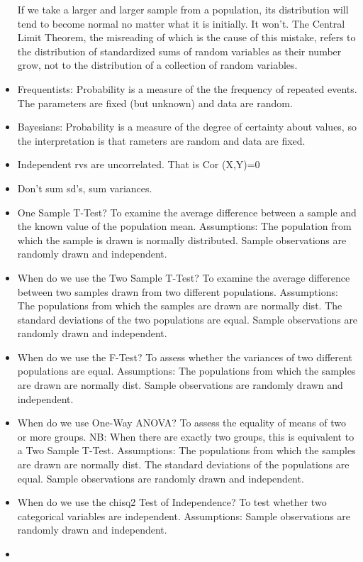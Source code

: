 \documentclass[]{book}
\begin{document}
\begin{itemize}
  If we take a larger and larger sample from a population, its
  distribution will tend to become normal no matter what it is
  initially. It won't. The Central Limit Theorem, the misreading of
  which is the cause of this mistake, refers to the distribution of
  standardized sums of random variables as their number grow, not to the
  distribution of a collection of random variables.
\item
  Frequentists: Probability is a measure of the the frequency of
  repeated events. The parameters are fixed (but unknown) and data are
  random.
\item
  Bayesians: Probability is a measure of the degree of certainty about
  values, so the interpretation is that rameters are random and data are
  fixed.
\item
  Independent rvs are uncorrelated. That is Cor (X,Y)=0
\item
  Don't sum sd's, sum variances.
\item
  One Sample T-Test? To examine the average difference between a sample
  and the known value of the population mean. Assumptions: The
  population from which the sample is drawn is normally distributed.
  Sample observations are randomly drawn and independent.
\item
  When do we use the Two Sample T-Test? To examine the average
  difference between two samples drawn from two different populations.
  Assumptions: The populations from which the samples are drawn are
  normally dist. The standard deviations of the two populations are
  equal. Sample observations are randomly drawn and independent.
\item
  When do we use the F-Test? To assess whether the variances of two
  different populations are equal. Assumptions: The populations from
  which the samples are drawn are normally dist. Sample observations are
  randomly drawn and independent.
\item
  When do we use One-Way ANOVA? To assess the equality of means of two
  or more groups. NB: When there are exactly two groups, this is
  equivalent to a Two Sample T-Test. Assumptions: The populations from
  which the samples are drawn are normally dist. The standard deviations
  of the populations are equal. Sample observations are randomly drawn
  and independent.
\item
  When do we use the chisq2 Test of Independence? To test whether two
  categorical variables are independent. Assumptions: Sample
  observations are randomly drawn and independent.
\item

\end{itemize}
\end{document}
